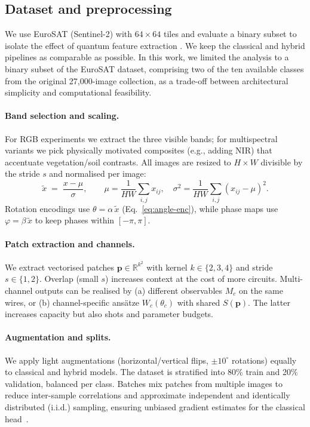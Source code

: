 \subsection{Dataset and preprocessing}
\label{sec:dataset-and-preprocessing}
We use EuroSAT (Sentinel-2) with $64{\times}64$ tiles and evaluate a binary subset to isolate the effect of quantum feature extraction \cite{Helber2019,Sebastianelli2021}. We keep the classical and hybrid pipelines as comparable as possible.
In this work, we limited the analysis to a binary subset of the EuroSAT dataset, 
comprising two of the ten available classes from the original 27{,}000-image collection, 
as a trade-off between architectural simplicity and computational feasibility.


\paragraph{Band selection and scaling.}
For RGB experiments we extract the three visible bands; for multispectral variants we pick physically motivated composites (e.g., adding NIR) that accentuate vegetation/soil contrasts. All images are resized to $H{\times}W$ divisible by the stride $s$ and normalised per image:
\begin{equation}
\tilde x \;=\; \frac{x-\mu}{\sigma},\qquad \mu=\frac{1}{HW}\textstyle\sum_{i,j}\!x_{ij},\quad
\sigma^{2}=\frac{1}{HW}\sum_{i,j}(x_{ij}-\mu)^2.
\end{equation}
Rotation encodings use $\theta=\alpha\,\tilde x$ (Eq.~\ref{eq:angle-enc}), while phase maps use $\varphi=\beta\,\tilde x$ to keep phases within $[-\pi,\pi]$.

\paragraph{Patch extraction and channels.}
We extract vectorised patches $\mathbf{p}\in\mathbb{R}^{k^2}$ with kernel $k\!\in\!\{2,3,4\}$ and stride $s\!\in\!\{1,2\}$. Overlap (small $s$) increases context at the cost of more circuits. Multi-channel outputs can be realised by (a) different observables $M_c$ on the same wires, or (b) channel-specific ansätze $W_c(\theta_c)$ with shared $S(\mathbf{p})$. The latter increases capacity but also shots and parameter budgets.

\paragraph{Augmentation and splits.}
We apply light augmentations (horizontal/vertical flips, $\pm 10^\circ$ rotations) equally to classical and hybrid models. The dataset is stratified into 80\% train and 20\% validation, balanced per class. Batches mix patches from multiple images to reduce inter-sample correlations
and approximate independent and identically distributed (i.i.d.) sampling, ensuring unbiased gradient estimates for the classical head~\cite{Goodfellow2016}.

